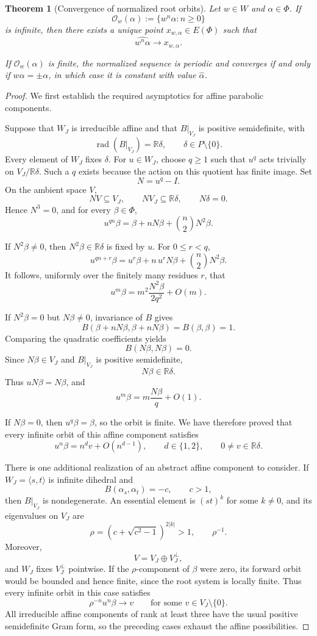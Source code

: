 \documentclass[11pt,reqno]{amsart}
\theoremstyle{plain}
\newtheorem{theorem}{Theorem}[section]
\theoremstyle{definition}
\theoremstyle{remark}
\numberwithin{equation}{section}
\begin{document}
\begin{theorem}[Convergence of normalized root orbits]
\label{thm:normalized-root-orbits}
Let $w\in W$ and $\alpha\in\Phi$.
If
\[
\mathcal O_w(\alpha)
:=
\{w^n\alpha:n\geq0\}
\]
is infinite, then there exists a unique point
$x_{w,\alpha}\in E(\Phi)$ such that
\[
\widehat{w^n\alpha}\longrightarrow x_{w,\alpha}.
\]

If $\mathcal O_w(\alpha)$ is finite, the normalized sequence
is periodic and converges if and only if
$w\alpha=\pm\alpha$, in which case it is constant with
value $\widehat{\alpha}$.
\end{theorem}

\begin{proof}
We first establish the required asymptotics for affine
parabolic components.

Suppose that $W_J$ is irreducible affine and that
$B|_{V_J}$ is positive semidefinite, with
\[
\operatorname{rad}(B|_{V_J})=\mathbb R\delta,
\qquad
\delta\in P\setminus\{0\}.
\]
Every element of $W_J$ fixes $\delta$.
For $u\in W_J$, choose $q\geq1$ such that $u^q$ acts
trivially on $V_J/\mathbb R\delta$.
Such a $q$ exists because the action on this quotient has
finite image.
Set
\[
N=u^q-I.
\]
On the ambient space $V$,
\[
NV\subseteq V_J,
\qquad
NV_J\subseteq\mathbb R\delta,
\qquad
N\delta=0.
\]
Hence $N^3=0$, and for every $\beta\in\Phi$,
\[
u^{qn}\beta
=
\beta+nN\beta+\binom n2N^2\beta.
\]

If $N^2\beta\neq0$, then $N^2\beta\in\mathbb R\delta$ is
fixed by $u$.
For $0\leq r<q$,
\[
u^{qn+r}\beta
=
u^r\beta+n\,u^rN\beta+\binom n2N^2\beta.
\]
It follows, uniformly over the finitely many residues $r$,
that
\[
u^m\beta
=
m^2\frac{N^2\beta}{2q^2}+O(m).
\]

If $N^2\beta=0$ but $N\beta\neq0$, invariance of $B$ gives
\[
B(\beta+nN\beta,\beta+nN\beta)=B(\beta,\beta)=1.
\]
Comparing the quadratic coefficients yields
\[
B(N\beta,N\beta)=0.
\]
Since $N\beta\in V_J$ and $B|_{V_J}$ is positive
semidefinite,
\[
N\beta\in\mathbb R\delta.
\]
Thus $uN\beta=N\beta$, and
\[
u^m\beta=m\frac{N\beta}{q}+O(1).
\]

If $N\beta=0$, then $u^q\beta=\beta$, so the orbit is finite.
We have therefore proved that every infinite orbit of this
affine component satisfies
\[
u^n\beta=n^d v+O(n^{d-1}),
\qquad
d\in\{1,2\},
\qquad
0\neq v\in\mathbb R\delta.
\]

There is one additional realization of an abstract affine
component to consider.
If $W_J=\langle s,t\rangle$ is infinite dihedral and
\[
B(\alpha_s,\alpha_t)=-c,
\qquad c>1,
\]
then $B|_{V_J}$ is nondegenerate.
An essential element is $(st)^k$ for some $k\neq0$, and
its eigenvalues on $V_J$ are
\[
\rho=(c+\sqrt{c^2-1})^{2|k|}>1,
\qquad
\rho^{-1}.
\]
Moreover,
\[
V=V_J\oplus V_J^\perp,
\]
and $W_J$ fixes $V_J^\perp$ pointwise.
If the $\rho$-component of $\beta$ were zero, its forward
orbit would be bounded and hence finite, since the root
system is locally finite.
Thus every infinite orbit in this case satisfies
\[
\rho^{-n}u^n\beta\longrightarrow v
\qquad
\text{for some }v\in V_J\setminus\{0\}.
\]
All irreducible affine components of rank at least three
have the usual positive semidefinite Gram form, so the
preceding cases exhaust the affine possibilities.


\end{proof}
\end{document}
